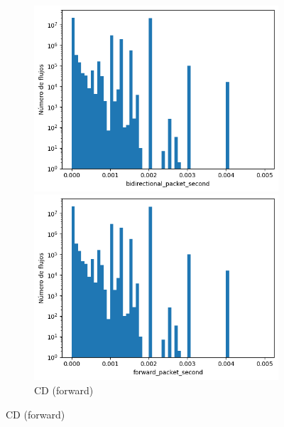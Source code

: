 \begin{figure}[H]
    \centering
    \hfill
    \begin{subfigure}[b]{0.26\textwidth}
        \centering
        \includegraphics[width=\textwidth]{media/packet_pincer_cicddos/bidirectional_packet_second_linear_x_log_y.png}
        \caption{CD (bidir.)}
        \includegraphics[width=\textwidth]{media/packet_pincer_cicddos/forward_packet_second_linear_x_log_y.png}
        \caption{CD (forward)}

\end{subfigure}
\end{figure}
